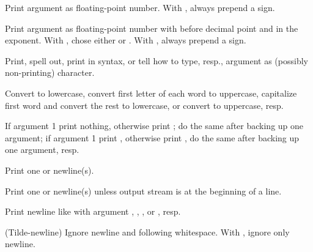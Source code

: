 \begin{LIST}{1cm}
\begin{LIST}{.5cm}
    Print argument as floating-point number. With , always prepend a sign.

    Print argument as floating-point number with 
    before decimal point and  in the
    exponent. With , chose either  or . With , always prepend a sign.

    Print, spell out, print in \kwd{\#$\backslash$} syntax, or tell how to type, resp., argument as
    (possibly non-printing) character.

    Convert to lowercase, convert first letter of each word to
    uppercase, capitalize first word and convert
    the rest to lowercase, or convert to uppercase, resp.

    If argument  1 print nothing, otherwise print ;
    do the same after backing up one argument; if argument  1
    print , otherwise print , do the same after
    backing up one argument, resp. 

    Print one or  newline(s).

    Print one or  newline(s) unless output stream is at the
    beginning of a line.

    Print newline like  with argument
    , , , or , resp.

    (Tilde-newline) Ignore newline and following
    whitespace. With , ignore only newline.


\end{LIST}
\end{LIST}
